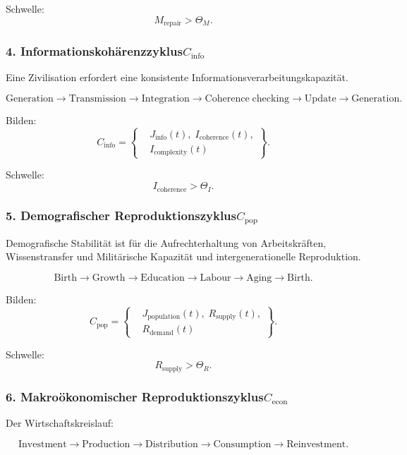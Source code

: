 Schwelle:
\[
  M_{\mathrm{repair}} > \Theta_M.
\]

\subsubsection{4. Informationskohärenzzyklus$C_{\mathrm{info}}$}

Eine Zivilisation erfordert eine konsistente Informationsverarbeitungskapazität.

\[
  \mathrm{Generation}
  \to
  \mathrm{Transmission}
  \to
  \mathrm{Integration}
  \to
  \mathrm{Coherence\;checking}
  \to
  \mathrm{Update}
  \to
  \mathrm{Generation}.
\]

Bilden:
\[
  C_{\mathrm{info}}
  =
  \left\{
  \begin{aligned}
    &J_{\mathrm{info}}(t),\;
     I_{\mathrm{coherence}}(t),\\
    &I_{\mathrm{complexity}}(t)
  \end{aligned}
  \right\}.
\]

Schwelle:
\[
  I_{\mathrm{coherence}} > \Theta_I.
\]

\subsubsection{5. Demografischer Reproduktionszyklus$C_{\mathrm{pop}}$}

Demografische Stabilität ist für die Aufrechterhaltung von Arbeitskräften, Wissenstransfer und
Militärische Kapazität und intergenerationelle Reproduktion.

\[
  \mathrm{Birth}
  \to
  \mathrm{Growth}
  \to
  \mathrm{Education}
  \to
  \mathrm{Labour}
  \to
  \mathrm{Aging}
  \to
  \mathrm{Birth}.
\]

Bilden:
\[
  C_{\mathrm{pop}}
    =
    \left\{
    \begin{aligned}
      &J_{\mathrm{population}}(t),\;
       R_{\mathrm{supply}}(t),\\
      &R_{\mathrm{demand}}(t)
    \end{aligned}
    \right\}.
\]

Schwelle:
\[
  R_{\mathrm{supply}} > \Theta_R.
\]

\subsubsection{6. Makroökonomischer Reproduktionszyklus$C_{\mathrm{econ}}$}

Der Wirtschaftskreislauf:

\[
  \mathrm{Investment}
  \to
  \mathrm{Production}
  \to
  \mathrm{Distribution}
  \to
  \mathrm{Consumption}
  \to
  \mathrm{Reinvestment}.
\]

